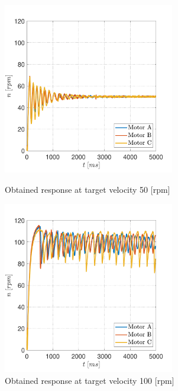 \documentclass[12pt,english]{article}
\begin{document}
\newpage
\begin{figure}[htb!]
	\centering
	\centering
	\includegraphics[height=7.5cm]{figures/controlled_50_p_02_i_11}
	\caption{Obtained response at target velocity 50 [rpm]}
	\label{obtained_response_50}
	\endminipage\hfill
	\centering
	\includegraphics[height=7.5cm]{figures/controlled_100_p_02_i_11}
	\caption{Obtained response at target velocity 100 [rpm]}
	\label{obtained_response_100}
	\endminipage\hfill
\end{figure}
\end{document}
